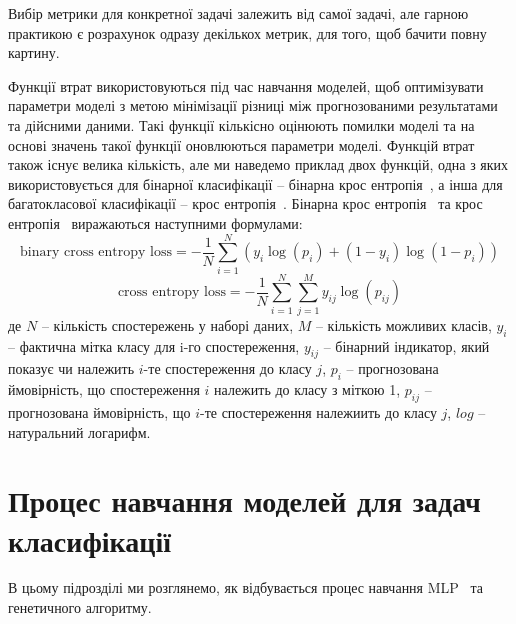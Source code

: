 Вибір метрики для конкретної задачі залежить від самої задачі, але гарною практикою є розрахунок одразу декількох метрик, для того, щоб бачити повну картину.

Функції втрат використовуються під час навчання моделей, щоб оптимізувати параметри моделі з метою мінімізації різниці між прогнозованими результатами та дійсними даними. Такі функції кількісно оцінюють помилки моделі та на основі значень такої функції оновлюються параметри моделі. Функцій втрат також існує велика кількість, але ми наведемо приклад двох функцій, одна з яких використовується для бінарної класифікації -- бінарна крос ентропія~\cite{ct27}, а інша для багатокласової класифікації -- крос ентропія~\cite{ct28}. Бінарна крос ентропія~\cite{ct27} та крос ентропія~\cite{ct28} виражаються наступними формулами:
\begin{equation}
	\label{eq:binary_cross_entropy}
	\text{binary cross entropy loss} = -\frac{1}{N} \sum_{i=1}^{N} \left( y_i \log(p_i) + (1 - y_i) \log(1 - p_i) \right)
\end{equation}
\begin{equation}
	\label{eq:cross_entropy}
	\text{cross entropy loss} = -\frac{1}{N} \sum_{i=1}^{N} \sum_{j=1}^{M} y_{ij} \log(p_{ij})
\end{equation}
де $N$ -- кількість спостережень у наборі даних, $M$ -- кількість можливих класів, $y_i$ -- фактична мітка класу для i-го спостереження, $y_{ij}$ -- бінарний індикатор, який показує чи належить $i$-те спостереження до класу $j$, $p_i$ -- прогнозована ймовірність, що спостереження $i$ належить до класу з міткою 1, $p_{ij}$ -- прогнозована ймовірність, що $i$-те спостереження належиить до класу $j$, $log$ -- натуральний логарифм.

\section{Процес навчання моделей для задач класифікації}\label{sec:training_process}


В цьому підрозділі ми розглянемо, як відбувається процес навчання MLP~\cite{ct26} та генетичного алгоритму.

